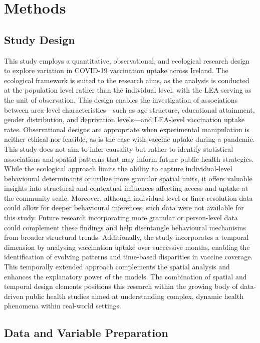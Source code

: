 \documentclass{article}
\begin{document}
\section{Methods}\label{methods}

\subsection{Study Design}\label{study-design}

This study employs a quantitative, observational, and ecological
research design to explore variation in COVID-19 vaccination uptake
across Ireland. The ecological framework is suited to the research aims,
as the analysis is conducted at the population level rather than the
individual level, with the LEA serving as the unit of observation. This
design enables the investigation of associations between area-level
characteristics---such as age structure, educational attainment, gender
distribution, and deprivation levels---and LEA-level vaccination uptake
rates. Observational designs are appropriate when experimental
manipulation is neither ethical nor feasible, as is the case with
vaccine uptake during a pandemic. This study does not aim to infer
causality but rather to identify statistical associations and spatial
patterns that may inform future public health strategies. While the
ecological approach limits the ability to capture individual-level
behavioural determinants or utilize more granular spatial units, it
offers valuable insights into structural and contextual influences
affecting access and uptake at the community scale. Moreover, although
individual-level or finer-resolution data could allow for deeper
behavioural inferences, such data were not available for this study.
Future research incorporating more granular or person-level data could
complement these findings and help disentangle behavioural mechanisms
from broader structural trends. Additionally, the study incorporates a
temporal dimension by analysing vaccination uptake over successive
months, enabling the identification of evolving patterns and time-based
disparities in vaccine coverage. This temporally extended approach
complements the spatial analysis and enhances the explanatory power of
the models. The combination of spatial and temporal design elements
positions this research within the growing body of data-driven public
health studies aimed at understanding complex, dynamic health phenomena
within real-world settings.

\subsection{Data and Variable
Preparation}\label{data-and-variable-preparation}
\end{document}
